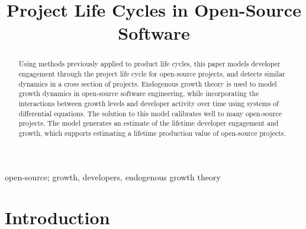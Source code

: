 \documentclass[conference]{IEEEtran}
\begin{document}
\title{Project Life Cycles in Open-Source Software}

\author{
}

\maketitle

\begin{abstract}

Using methods previously applied to product life cycles, this paper models developer engagement through the project life cycle for open-source projects, and detects similar dynamics in a cross section of projects. Endogenous growth theory is used to model growth dynamics in open-source software engineering, while incorporating the interactions between growth levels and developer activity over time using  systems of differential equations. The solution to this model calibrates well to many open-source projects. The model generates an estimate of the lifetime developer engagement and growth, which supports estimating a lifetime production value of open-source projects. 

\end{abstract}

\begin{IEEEkeywords}
open-source; growth, developers, endogenous growth theory
\end{IEEEkeywords}

\section{Introduction}
\end{document}
